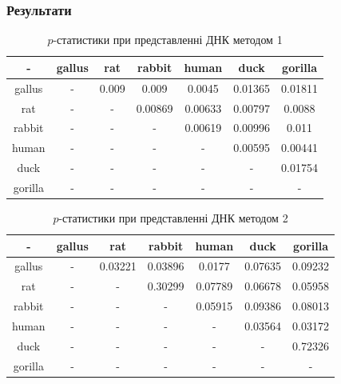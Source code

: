 \documentclass[mathserif,serif,10pt]{beamer}
\begin{document}
\begin{frame}
\frametitle{Результати}
\begin{table}[h!]
\begin{center}
\begin{tabular}{|c|c|c|c|c|c|c|}
\hline
- & gallus & rat & rabbit & human & duck & gorilla \\ \hline
gallus & - & 0.009 & 0.009 & 0.0045 & 0.01365 & 0.01811 \\ \hline
rat & - & - & 0.00869 & 0.00633 & 0.00797 & 0.0088 \\ \hline
rabbit & - & - & - & 0.00619 & 0.00996 & 0.011 \\ \hline
human & - & - & - & - & 0.00595 & 0.00441 \\ \hline
duck & - & - & - & - & - & 0.01754 \\ \hline
gorilla & - & - & - & - & - & - \\ \hline
\end{tabular}
\end{center}
\caption{$p$-статистики при представленні ДНК методом 1}
\label{table:res1}
\end{table}

\begin{table}[h!]
\begin{center}
\begin{tabular}{|c|c|c|c|c|c|c|}
\hline
- & gallus & rat & rabbit & human & duck & gorilla \\ \hline
gallus & - & 0.03221 & 0.03896 & 0.0177 & 0.07635 & 0.09232 \\ \hline
rat & - & - & 0.30299 & 0.07789 & 0.06678 & 0.05958 \\ \hline
rabbit & - & - & - & 0.05915 & 0.09386 & 0.08013 \\ \hline
human & - & - & - & - & 0.03564 & 0.03172 \\ \hline
duck & - & - & - & - & - & 0.72326 \\ \hline
gorilla & - & - & - & - & - & - \\ \hline
\end{tabular}
\end{center}
\caption{$p$-статистики при представленні ДНК методом 2}
\label{table:res2}
\end{table}

\end{frame}
\end{document}

